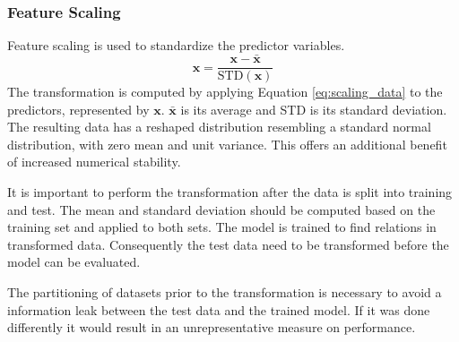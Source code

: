 \subsubsection{Feature Scaling} \label{sec:scaling_predictors}
Feature scaling is used to standardize the predictor variables.
\begin{equation} \label{eq:scaling_data}
    \mathbf{x} = \frac{\mathbf{x} - \bar{\mathbf{x}}}{\text{STD}(\mathbf{x})}
\end{equation}
The transformation is computed by applying Equation \eqref{eq:scaling_data} to the predictors, represented by $\mathbf{x}$. $\bar{\mathbf{x}}$ is its average and STD is its standard deviation. The resulting data has a reshaped distribution resembling a standard normal distribution, with zero mean and unit variance. This offers an additional benefit of increased numerical stability. %

It is important to perform the transformation after the data is split into training and test. The mean and standard deviation should be computed based on the training set and applied to both sets. The model is trained to find relations in transformed data. Consequently the test data need to be transformed before the model can be evaluated. 

The partitioning of datasets prior to the transformation is necessary to avoid a information leak between the test data and the trained model. If it was done differently it would result in an unrepresentative measure on performance.

 


